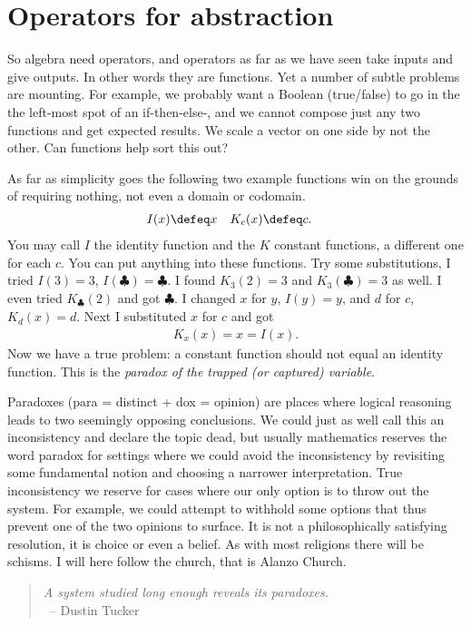 
\section{Operators for abstraction}
So algebra need operators, and operators as far as we have seen take 
inputs and give outputs.  In other words they are functions.  
Yet a number of subtle problems are 
mounting.  For example, we probably want a Boolean (true/false) to 
go in the the left-most spot of an if-then-else-, and we cannot compose 
just any two functions and get expected results.  We scale a vector on one side 
by not the other.  Can functions help sort this out?



As far as simplicity goes the following two example functions win 
on the grounds of requiring nothing, not even a domain or codomain.
\begin{align*}
    I(x) & \defeq x & 
    K_c(x) & \defeq c.
\end{align*}
You may call $I$ the identity function and the $K$ constant functions,
a different one for each $c$.  You can put anything into these functions.
Try some substitutions, I tried $I(3)=3$, $I(\clubsuit)=\clubsuit$.
I found $K_3(2)=3$ and $K_3(\clubsuit)=3$ as well.  I even tried 
$K_{\clubsuit}(2)$ and got $\clubsuit$.  I changed $x$ for $y$, 
$I(y)=y$, and $d$ for $c$, $K_d(x)=d$. Next I substituted $x$ for $c$ and got
\begin{align*}
    K_x(x)=x=I(x).
\end{align*}
Now we have a true problem: a constant function should not equal 
an identity function.  This is the \emph{paradox of the trapped (or captured) variable}.


Paradoxes (para = distinct + dox = opinion) are places where logical reasoning
leads to two seemingly opposing conclusions.  We could just as well call this an
inconsistency and declare the topic dead, but usually mathematics reserves the
word paradox for settings where we could avoid the inconsistency by revisiting
some fundamental notion and choosing a narrower interpretation.  True
inconsistency we reserve for cases where our only option is to throw out the
system.  For example, we could attempt to withhold some options that thus
prevent one of the two opinions to surface.  It is not a philosophically
satisfying resolution, it is choice or even a belief. As with most religions there
will be schisms.  I will here follow the church, that is Alanzo Church.

\begin{quote}
\emph{A system studied long enough reveals its paradoxes.}\\
~\hfill-- Dustin Tucker
\end{quote}

